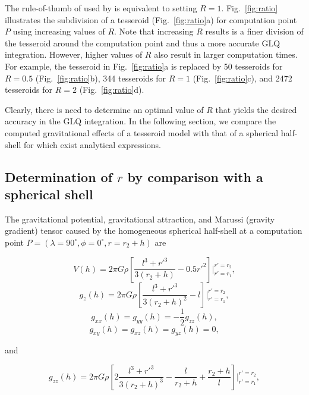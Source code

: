 The rule-of-thumb of \citet{Ku1977}
used by \citet{Li2011}
is equivalent to setting $R=1$.
Fig.~\ref{fig:ratio}
illustrates the subdivision of a tesseroid
(Fig.~\ref{fig:ratio}a)
for computation point $P$
using increasing values of $R$.
Note that increasing $R$
results is a finer division of the tesseroid
around the computation point
and thus a more accurate GLQ integration.
However, higher values of $R$
also result in
larger computation times.
For example,
the tesseroid in Fig.~\ref{fig:ratio}a
is replaced by
50 tesseroids for $R=0.5$ (Fig.~\ref{fig:ratio}b),
344 tesseroids for $R=1$ (Fig.~\ref{fig:ratio}c),
and 2472 tesseroids for  $R=2$ (Fig.~\ref{fig:ratio}d).

Clearly,
there is need to determine
an optimal value of $R$
that yields the desired accuracy
in the GLQ integration.
In the following section,
we compare the computed gravitational effects
of a tesseroid model
with that of a spherical half-shell
for which exist analytical expressions.


\subsection{Determination of $r$ by comparison with a spherical shell}

The gravitational potential,
gravitational attraction,
and
Marussi (gravity gradient) tensor
caused by the homogeneous spherical half-shell
at a computation point
$P = (\lambda=90^\circ, \phi=0^\circ, r=r_2+h)$
are

\begin{equation}
    V(h) = 2\pi G \rho \left[
        \frac{l^3 + {r'}^3}{3(r_2 + h)} - 0.5 {r'}^2 \right]
         \Biggr|_{r'=r_1}^{r'=r_2},
    \label{eq:shellpot}
\end{equation}
\begin{equation}
    g_z(h) = 2\pi G \rho \left[
        \frac{l^3 + {r'}^3}{3(r_2 + h)^2} - l \right]
        \Biggr|_{r'=r_1}^{r'=r_2},
    \label{eq:shellgz}
\end{equation}
\begin{equation}
    g_{xx}(h) = g_{yy}(h) = -\frac{1}{2} g_{zz}(h),
\end{equation}
\begin{equation}
    g_{xy}(h) = g_{xz}(h) = g_{yz}(h) = 0,
\end{equation}

\noindent
and

\begin{equation}
    g_{zz}(h) = 2\pi G \rho \left[
        2\frac{l^3 + {r'}^3}{3(r_2 + h)^3}
        - \frac{l}{r_2 + h} + \frac{r_2 + h}{l}
        \right]
        \Biggr|_{r'=r_1}^{r'=r_2},
    \label{eq:shellgzz}
\end{equation}

